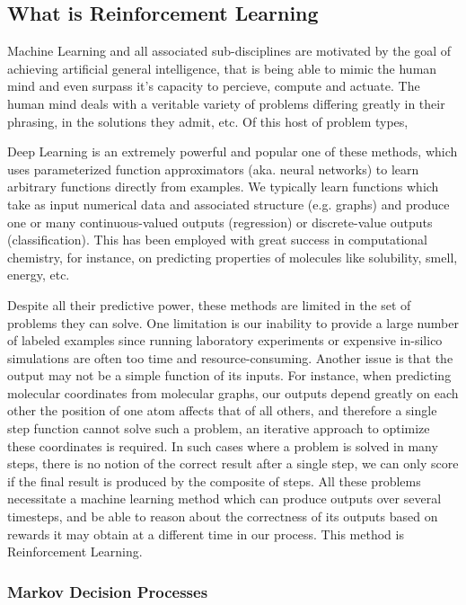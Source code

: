 \subsection{What is Reinforcement Learning}

Machine Learning and all associated sub-disciplines are motivated by the goal of achieving artificial general intelligence, that is being able to mimic the human mind and even surpass it's capacity to percieve, compute and actuate. The human mind deals with a veritable variety of problems differing greatly in their phrasing, in the solutions they admit, etc. Of this host of problem types, 

Deep Learning is an extremely powerful and popular one of these methods, which uses parameterized function approximators (aka. neural networks) to learn arbitrary functions directly from examples. We typically learn functions which take as input numerical data and associated structure (e.g. graphs) and produce one or many continuous-valued outputs (regression) or discrete-value outputs (classification). This has been employed with great success in computational chemistry, for instance, on predicting properties of molecules like solubility, smell, energy, etc. %

Despite all their predictive power, these methods are limited in the set of problems they can solve. One limitation is our inability to provide a large number of labeled examples since running laboratory experiments or expensive in-silico simulations are often too time and resource-consuming. Another issue is that the output may not be a simple function of its inputs. For instance, when predicting molecular coordinates from molecular graphs, our outputs depend greatly on each other the position of one atom affects that of all others, and therefore a single step function cannot solve such a problem, an iterative approach to optimize these coordinates is required. In such cases where a problem is solved in many steps, there is no notion of the correct result after a single step, we can only score if the final result is produced by the composite of steps. All these problems necessitate a machine learning method which can produce outputs over several timesteps, and be able to reason about the correctness of its outputs based on rewards it may obtain at a different time in our process. This method is Reinforcement Learning. \cite{rl-intro-sutton-barto}


\subsubsection{Markov Decision Processes}

